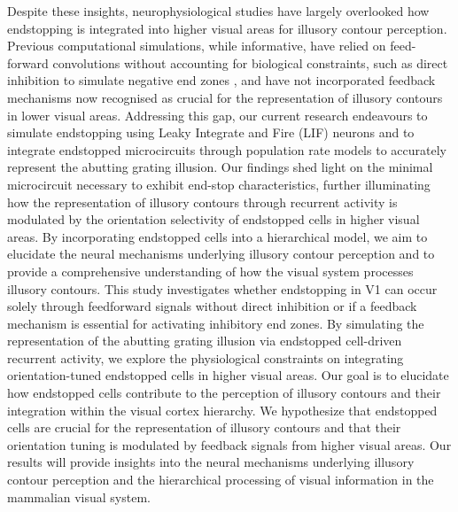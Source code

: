 \documentclass[12pt]{article}
\begin{document}
\bigbreak
Despite these insights, neurophysiological studies have largely overlooked how endstopping is integrated into higher visual areas for illusory contour perception. Previous computational simulations, while informative, have relied on feed-forward convolutions without accounting for biological constraints, such as direct inhibition to simulate negative end zones \autocite{sillitoContributionExcitatoryInhibitory1977}, and have not incorporated feedback mechanisms now recognised as crucial for the representation of illusory contours in lower visual areas. Addressing this gap, our current research endeavours to simulate endstopping using Leaky Integrate and Fire (LIF) neurons and to integrate endstopped microcircuits through population rate models to accurately represent the abutting grating illusion. Our findings shed light on the minimal microcircuit necessary to exhibit end-stop characteristics, further illuminating how the representation of illusory contours through recurrent activity is modulated by the orientation selectivity of endstopped cells in higher visual areas. By incorporating endstopped cells into a hierarchical model, we aim to elucidate the neural mechanisms underlying illusory contour perception and to provide a comprehensive understanding of how the visual system processes illusory contours.
\bigbreak
This study investigates whether endstopping in V1 can occur solely through feedforward signals without direct inhibition or if a feedback mechanism is essential for activating inhibitory end zones. By simulating the representation of the abutting grating illusion via endstopped cell-driven recurrent activity, we explore the physiological constraints on integrating orientation-tuned endstopped cells in higher visual areas. Our goal is to elucidate how endstopped cells contribute to the perception of illusory contours and their integration within the visual cortex hierarchy. We hypothesize that endstopped cells are crucial for the representation of illusory contours and that their orientation tuning is modulated by feedback signals from higher visual areas. Our results will provide insights into the neural mechanisms underlying illusory contour perception and the hierarchical processing of visual information in the mammalian visual system.


\newpage
\end{document}
